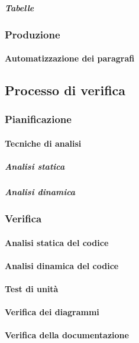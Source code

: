 				\subparagraph{Tabelle}

		\subsubsection{Produzione}

			\paragraph{Automatizzazione dei paragrafi}

	\subsection{Processo di verifica}

		\subsubsection{Pianificazione}

			\paragraph{Tecniche di analisi}

				\subparagraph{Analisi statica}

				\subparagraph{Analisi dinamica}

		\subsubsection{Verifica}

			\paragraph{Analisi statica del codice}

			\paragraph{Analisi dinamica del codice}

			\paragraph{Test di unità}

			\paragraph{Verifica dei diagrammi}

			\paragraph{Verifica della documentazione}

